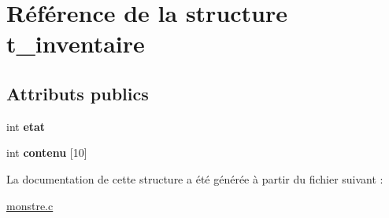 \hypertarget{structt__inventaire}{\section{Référence de la structure t\-\_\-inventaire}
\label{structt__inventaire}
}
\subsection*{Attributs publics}
\begin{DoxyCompactItemize}
\item 
\hypertarget{structt__inventaire_a3adff6f721142444573fe36a99c7d00c}{int {\bfseries etat}}\label{structt__inventaire_a3adff6f721142444573fe36a99c7d00c}

\item 
\hypertarget{structt__inventaire_a2be856026d5914f611b9fc5bcb22aedc}{int {\bfseries contenu} \mbox{[}10\mbox{]}}\label{structt__inventaire_a2be856026d5914f611b9fc5bcb22aedc}

\end{DoxyCompactItemize}


La documentation de cette structure a été générée à partir du fichier suivant \-:\begin{DoxyCompactItemize}
\item 
\hyperlink{monstre_8c}{monstre.\-c}\end{DoxyCompactItemize}
